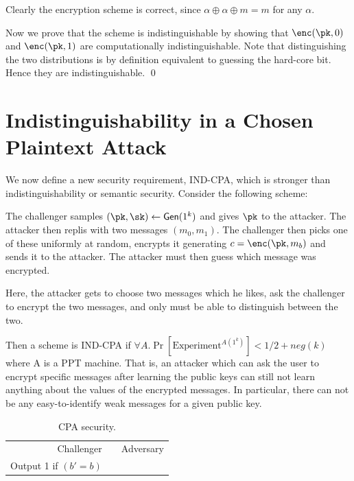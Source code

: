 \documentclass[12pt]{tufte-book}
\newcommand{\gen}{\mathsf{Gen}}
\begin{document}
\proof
Clearly the encryption scheme is correct, since $\alpha \oplus \alpha \oplus m = m$ for any $\alpha$.

Now we  prove  that the scheme is indistinguishable by showing that $\enc(\pk, 0)$ and $\enc(\pk, 1)$
are computationally indistinguishable. Note that distinguishing the two distributions is by definition equivalent to guessing the hard-core bit.
Hence they are indistinguishable.
\qed



\section{Indistinguishability in a Chosen Plaintext Attack}

We now define a new security requirement, IND-CPA, which is stronger than indistinguishability
or semantic security. Consider the following scheme:

The challenger samples $(\pk, \sk) \gets \gen(1^k)$  and gives $\pk$ to the attacker.
The attacker then replis with two messages $(m_0, m_1)$. The challenger then picks
one of these uniformly at random, encrypts it generating $c = \enc(\pk, m_b)$ and sends
it to the attacker. The attacker must then guess which message was encrypted.

Here, the attacker gets to choose two messages which he likes, ask the challenger to
encrypt the two messages, and only must be able to distinguish between the two.

Then a scheme is IND-CPA if $\forall A . \Pr[\text{Experiment}^{A(1^k)}] < 1/2+neg(k)$ where
A is a PPT machine. That is,
an attacker which can ask the user to encrypt specific messages after learning the
public keys can still not learn anything about the values of the encrypted messages. In
particular, there can not be any easy-to-identify weak messages for a given public key.

\begin{table}[ht]
\centering
\begin{tabular}{r c l}
Challenger & & Adversary \\
Output 1 if $(b'=b)$ & & \\
\end{tabular}
\caption{CPA security.}\label{tab:cpa}
\end{table}
\end{document}
